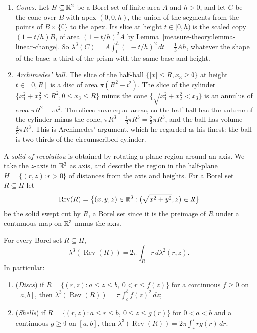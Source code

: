 \begin{example}\label{measure-theory:example-cavalieri}
\begin{enumerate}
\item \emph{Cones.} Let $B \subseteq \mathbb{R}^2$ be a Borel set of finite area $A$ and $h > 0$, and let $C$ be the cone over $B$ with apex $(0, 0, h)$, the union of the segments from the points of $B \times \{0\}$ to the apex.
Its slice at height $t \in [0, h)$ is the scaled copy $(1 - t/h)B$, of area $(1 - t/h)^2A$ by Lemma~\ref{measure-theory:lemma-linear-change}. So $\lambda^3(C) = A\int_0^h(1 - t/h)^2\,dt = \frac13Ah$, whatever the shape of the
base: a third of the prism with the same base and height.
\item \emph{Archimedes' ball.} The slice of the half-ball $\{|x| \leq R, x_3 \geq 0\}$ at height $t \in [0, R]$ is a disc of area $\pi(R^2 - t^2)$. The slice of the cylinder $\{x_1^2 + x_2^2 \leq R^2, 0 \leq x_3 \leq R\}$ minus
the cone $\{\sqrt{x_1^2 + x_2^2} < x_3\}$ is an annulus of area $\pi R^2 - \pi t^2$. The slices have equal areas, so the half-ball has the volume of the cylinder minus the cone, $\pi R^3 - \frac13\pi R^3 = \frac23\pi R^3$, and
the ball has volume $\frac43\pi R^3$. This is Archimedes' argument, which he regarded as his finest: the ball is two thirds of the circumscribed cylinder.
\end{enumerate}
\end{example}

A \emph{solid of revolution} is obtained by rotating a plane region around an axis. We take the $z$-axis in $\mathbb{R}^3$ as axis, and describe the region in the half-plane $H = \{(r, z) : r > 0\}$ of distances
from the axis and heights. For a Borel set $R \subseteq H$ let
\[
\operatorname{Rev}(R) = \bigl\{(x, y, z) \in \mathbb{R}^3 : \bigl(\sqrt{x^2 + y^2}, z\bigr) \in R\bigr\}
\]
be the solid swept out by $R$, a Borel set since it is the preimage of $R$ under a continuous map on $\mathbb{R}^3$ minus the axis.

\begin{proposition}\label{measure-theory:proposition-revolution-volume}
For every Borel set $R \subseteq H$,
\[
\lambda^3(\operatorname{Rev}(R)) = 2\pi\int_Rr\,d\lambda^2(r, z) .
\]
In particular:
\begin{enumerate}
\item (\emph{Discs}) if $R = \{(r, z) : a \leq z \leq b,\ 0 < r \leq f(z)\}$ for a continuous $f \geq 0$ on $[a, b]$, then $\lambda^3(\operatorname{Rev}(R)) = \pi\int_a^bf(z)^2\,dz$;
\item (\emph{Shells}) if $R = \{(r, z) : a \leq r \leq b,\ 0 \leq z \leq g(r)\}$ for $0 < a < b$ and a continuous $g \geq 0$ on $[a, b]$, then $\lambda^3(\operatorname{Rev}(R)) = 2\pi\int_a^brg(r)\,dr$.
\end{enumerate}
\end{proposition}

